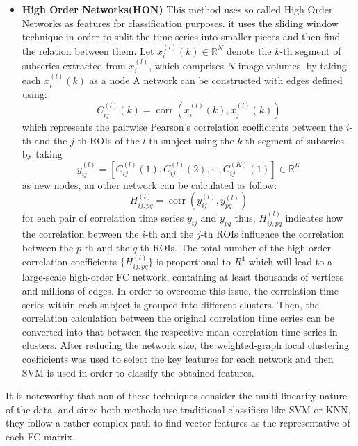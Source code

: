 \documentclass[journal]{IEEEtran}
\begin{document}
\begin{itemize}
	\item \textbf{High Order Networks(HON)}
	This method uses so called High Order Networks as features for classification purposes. it uses the sliding window technique in order to split the time-series into smaller pieces and then find the relation between them. Let $x_{i}^{(l)}(k) \in \mathbb{R}^N$ denote the $k$-th segment of subseries extracted from $x_{i}^{(l)}$, which comprises $N$ image volumes. by taking each $x_{i}^{(l)}(k)$ as a node A network can be constructed with edges defined using:
	\[
	C_{ij}^{(l)}(k) = \operatorname{corr}\left(x_{i}^{(l)}(k),x_{j}^{(l)}(k)
	\right)
	\]
	which represents the pairwise Pearson’s correlation coefficients
	between the $i$-th and the $j$-th ROIs of the $l$-th subject using the $k$-th segment of subseries. 
	by taking  
	\[
	y_{ij}^{(l)} = \left[ 
	C_{ij}^{(l)}(1), C_{ij}^{(l)}(2), \cdots , C_{ij}^{(K)}(1) 
	\right] \in \mathbb{R}^K
	\]
	as new nodes, an other network can be calculated as follow: 
	\[
	H_{ij,pq}^{(l)} = \operatorname{corr} \left(
	y_{ij}^{(l)},y_{pq}^{(l)}
	\right)
	\]
	for each pair of correlation time series $y_{ij}$ and $y_{pq}$ thus, $H_{ij,pq}^{(l)}$ indicates how the correlation between the $i$-th and the $j$-th ROIs influence the correlation between the $p$-th and the $q$-th ROIs.
	The total number of the high-order correlation coefficients
	$\{ H_{ij,pq}^{(l)} \}$ is proportional to $R^4$ which will lead to a large-scale high-order FC
	network, containing at least thousands of vertices and millions
	of edges. In order to overcome this issue, the correlation time series within each subject is grouped into different clusters. Then, the correlation calculation
	between the original correlation time series can be
	converted into that between the respective mean correlation
	time series in clusters. After reducing the network size, the
	weighted-graph local clustering coefficients was used to select the key features for each network and then SVM is used in order to classify the obtained features.  
\end{itemize}

It is noteworthy that non of these techniques consider the multi-linearity nature of the data, and since both methods use traditional classifiers like SVM or KNN, they follow a rather complex path to find vector features as the representative of each FC matrix.
	
\end{document}
